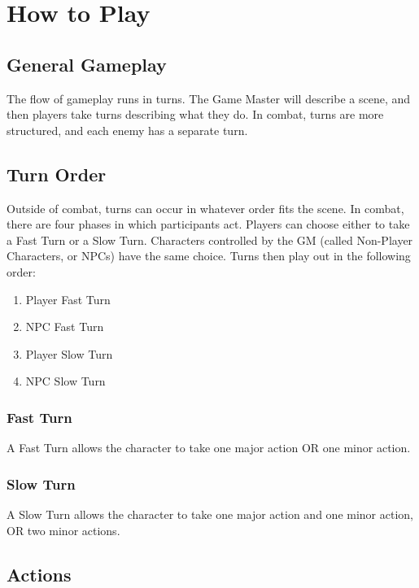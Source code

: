 \chapter{How to Play}

\begin{multicols}{2}

\section{General Gameplay}

The flow of gameplay runs in turns. The Game Master will 
describe a scene, and then players take turns describing 
what they do. In combat, turns are more structured, and each 
enemy has a separate turn.

\section{Turn Order}

Outside of combat, turns can occur in whatever order fits the 
scene. In combat, there are four phases in which participants
act. Players can choose either to take a Fast Turn or a Slow
Turn. Characters controlled by the GM (called Non-Player 
Characters, or NPCs) have the same choice. Turns then play out 
in the following order:

\begin{enumerate}
    \item Player Fast Turn
    \item NPC Fast Turn
    \item Player Slow Turn
    \item NPC Slow Turn
\end{enumerate}

\subsection{Fast Turn}

A Fast Turn allows the character to take one major action OR
one minor action.

\subsection{Slow Turn}

A Slow Turn allows the character to take one major action and
one minor action, OR two minor actions.

\section{Actions}


\end{multicols}
